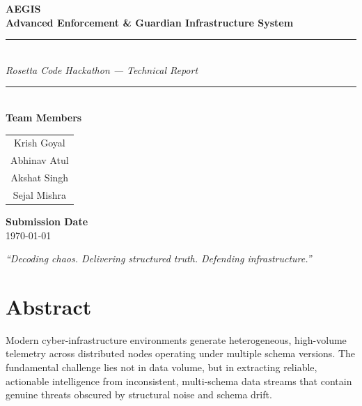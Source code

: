 \documentclass[12pt,a4paper]{article}
\begin{document}
\begin{titlepage}
    \centering
    \vspace*{1.5cm}

    {\Huge\bfseries\color{aegisblue} AEGIS}\\[0.4cm]
    {\Large\bfseries\color{darkgray} Advanced Enforcement \& Guardian Infrastructure System}\\[0.8cm]
    \rule{\linewidth}{1pt}\\[0.6cm]
    {\large\itshape Rosetta Code Hackathon --- Technical Report}\\[0.4cm]
    \rule{\linewidth}{0.5pt}\\[1.6cm]

    {\large\bfseries Team Members}\\[0.5cm]
    \begin{tabular}{c}
        \large Krish Goyal \\[4pt]
        \large Abhinav Atul \\[4pt]
        \large Akshat Singh \\[4pt]
        \large Sejal Mishra \\
    \end{tabular}

    \vfill

    {\large\bfseries Submission Date}\\[0.3cm]
    {\large \today}\\[1.5cm]

    \begin{infobox}
        \centering
        \textit{``Decoding chaos. Delivering structured truth. Defending infrastructure.''}
    \end{infobox}
\end{titlepage}

\newpage
\tableofcontents
\newpage

\section{Abstract}

Modern cyber-infrastructure environments generate heterogeneous, high-volume telemetry across distributed nodes operating under multiple schema versions. The fundamental challenge lies not in data volume, but in extracting reliable, actionable intelligence from inconsistent, multi-schema data streams that contain genuine threats obscured by structural noise and schema drift.
\end{document}
